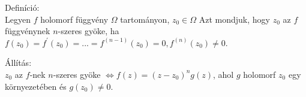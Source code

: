 \documentclass[12pt,a4paper]{scrartcl}
\newenvironment{definicio}{}{}
\newenvironment{allitas}{}{}
\begin{document}
\begin{definicio}

Definíció:\\
Legyen \(f\) holomorf függvény \(\Omega\) tartományon,
\(z_{0} \in \Omega\) Azt mondjuk, hogy \(z_{0}\) az \(f\) függvénynek
\(n\)-szeres gyöke, ha
\(f\left( z_{0} \right) = f^{\prime}\left( z_{0} \right) = ... = f^{({n - 1})}\left( z_{0} \right) = 0,f^{(n)}\left( z_{0} \right) \neq 0\).

\end{definicio}

\begin{allitas}

Állítás:\\
\(z_{0}\) az \(f\)-nek \(n\)-szeres gyöke
\(\left. \Leftrightarrow f\left( z \right) = \left( {z - z_{0}} \right)^{n}g\left( z \right) \right.\),
ahol \(g\) holomorf \(z_{0}\) egy környezetében és
\(g\left( z_{0} \right) \neq 0\).

\end{allitas}
\end{document}
